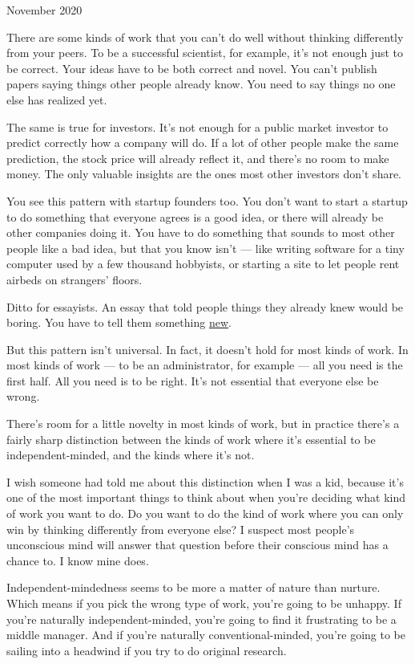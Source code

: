 November 2020

There are some kinds of work that you can't do well without thinking
differently from your peers. To be a successful scientist, for example,
it's not enough just to be correct. Your ideas have to be both correct
and novel. You can't publish papers saying things other people already
know. You need to say things no one else has realized yet.

The same is true for investors. It's not enough for a public market
investor to predict correctly how a company will do. If a lot of other
people make the same prediction, the stock price will already reflect
it, and there's no room to make money. The only valuable insights are
the ones most other investors don't share.

You see this pattern with startup founders too. You don't want to start
a startup to do something that everyone agrees is a good idea, or there
will already be other companies doing it. You have to do something that
sounds to most other people like a bad idea, but that you know isn't ---
like writing software for a tiny computer used by a few thousand
hobbyists, or starting a site to let people rent airbeds on strangers'
floors.

Ditto for essayists. An essay that told people things they already knew
would be boring. You have to tell them something
\href{useful.html}{new}.

But this pattern isn't universal. In fact, it doesn't hold for most
kinds of work. In most kinds of work --- to be an administrator, for
example --- all you need is the first half. All you need is to be right.
It's not essential that everyone else be wrong.

There's room for a little novelty in most kinds of work, but in practice
there's a fairly sharp distinction between the kinds of work where it's
essential to be independent-minded, and the kinds where it's not.

I wish someone had told me about this distinction when I was a kid,
because it's one of the most important things to think about when you're
deciding what kind of work you want to do. Do you want to do the kind of
work where you can only win by thinking differently from everyone else?
I suspect most people's unconscious mind will answer that question
before their conscious mind has a chance to. I know mine does.

Independent-mindedness seems to be more a matter of nature than nurture.
Which means if you pick the wrong type of work, you're going to be
unhappy. If you're naturally independent-minded, you're going to find it
frustrating to be a middle manager. And if you're naturally
conventional-minded, you're going to be sailing into a headwind if you
try to do original research.

